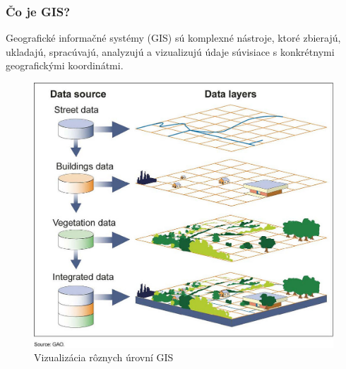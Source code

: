 \documentclass{beamer}
\begin{document}
\begin{frame}[fragile=singleslide]\frametitle{Čo je GIS?}
Geografické informačné systémy (GIS) sú komplexné nástroje, ktoré zbierajú, ukladajú, spracúvajú, analyzujú a vizualizujú údaje súvisiace s konkrétnymi geografickými koordinátmi.
\begin{figure}[h]
	\centering
	\includegraphics[scale=0.4]{image3.jpg}
	\caption{Vizualizácia rôznych úrovní GIS}
	\label{fig:gis}
\end{figure}
\end{frame}
\end{document}
